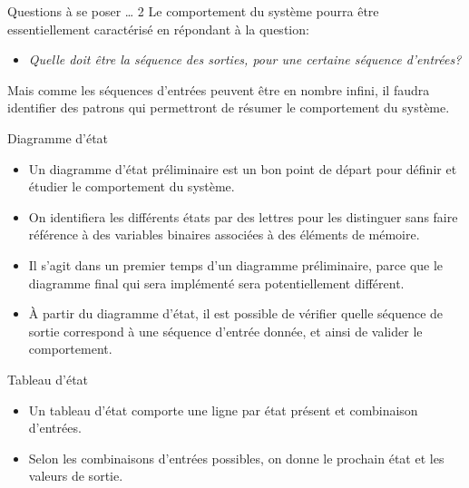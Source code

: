 \documentclass[presentation]{beamer}
\begin{document}
\begin{frame}[label={sec:orge0bc278}]{Questions à se poser \ldots{} 2}
Le comportement du système pourra être essentiellement caractérisé en répondant à la question:

\begin{itemize}
\item \emph{Quelle doit être la séquence des sorties, pour une certaine séquence d'entrées?}
\end{itemize}

Mais comme les séquences d'entrées peuvent être en nombre infini, il faudra identifier des patrons qui permettront de résumer le comportement du système.
\end{frame}

\begin{frame}[label={sec:org9038476}]{Diagramme d'état}
\begin{itemize}
\item Un diagramme d'état préliminaire est un bon point de départ pour définir et étudier le comportement du système.

\item On identifiera les différents états par des lettres pour les distinguer sans faire référence à des variables binaires associées à des éléments de mémoire.

\item Il s'agit dans un premier temps d'un diagramme préliminaire, parce que le diagramme final qui sera implémenté sera potentiellement différent.

\item À partir du diagramme d'état, il est possible de vérifier quelle séquence de sortie correspond à une séquence d'entrée donnée, et ainsi de valider le comportement.
\end{itemize}
\end{frame}

\begin{frame}[label={sec:orgae78a55}]{Tableau d'état}
\begin{itemize}
\item Un tableau d'état comporte une ligne par état présent et combinaison d'entrées.

\item Selon les combinaisons d'entrées possibles, on donne le prochain état et les valeurs de sortie.
\end{itemize}
\end{frame}
\end{document}
